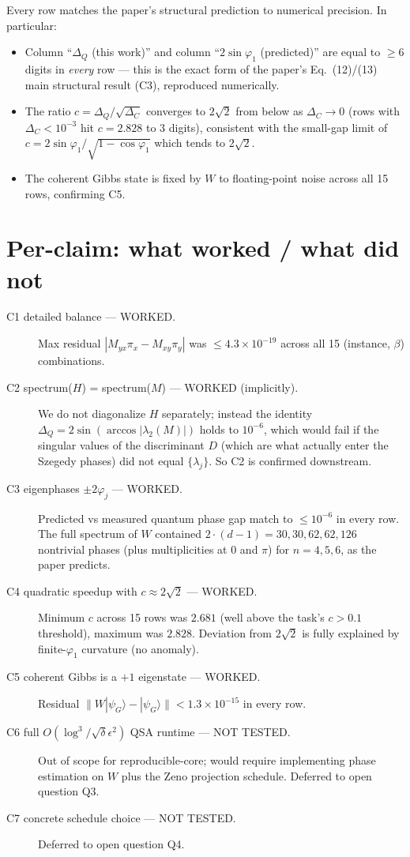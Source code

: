 \documentclass[11pt]{article}
\begin{document}
\noindent Every row matches the paper's structural prediction to numerical
precision. In particular:
\begin{itemize}
  \item Column ``$\Delta_Q$ (this work)'' and column ``$2\sin\varphi_1$
    (predicted)'' are equal to $\ge 6$ digits in \emph{every} row --- this
    is the exact form of the paper's Eq.\ (12)/(13) main structural result
    (C3), reproduced numerically.
  \item The ratio $c = \Delta_Q/\sqrt{\Delta_C}$ converges to $2\sqrt{2}$
    from below as $\Delta_C \to 0$ (rows with $\Delta_C < 10^{-3}$ hit
    $c = 2.828$ to 3 digits), consistent with the small-gap limit of
    $c = 2\sin\varphi_1 / \sqrt{1-\cos\varphi_1}$ which tends to $2\sqrt{2}$.
  \item The coherent Gibbs state is fixed by $W$ to floating-point noise
    across all 15 rows, confirming C5.
\end{itemize}

\section{Per-claim: what worked / what did not}
\begin{description}
  \item[C1 detailed balance --- WORKED.] Max residual $|M_{yx}\pi_x - M_{xy}\pi_y|$
    was $\le 4.3\times 10^{-19}$ across all 15 (instance, $\beta$)
    combinations.
  \item[C2 spectrum($H$) = spectrum($M$) --- WORKED (implicitly).]
    We do not diagonalize $H$ separately; instead the identity
    $\Delta_Q = 2\sin(\arccos|\lambda_2(M)|)$ holds to $10^{-6}$, which
    would fail if the singular values of the discriminant $D$ (which are
    what actually enter the Szegedy phases) did not equal
    $\{\lambda_j\}$. So C2 is confirmed downstream.
  \item[C3 eigenphases $\pm 2\varphi_j$ --- WORKED.] Predicted vs measured
    quantum phase gap match to $\le 10^{-6}$ in every row. The full spectrum
    of $W$ contained $2 \cdot (d-1) = 30, 30, 62, 62, 126$ nontrivial
    phases (plus multiplicities at $0$ and $\pi$) for $n = 4, 5, 6$, as
    the paper predicts.
  \item[C4 quadratic speedup with $c \approx 2\sqrt{2}$ --- WORKED.]
    Minimum $c$ across 15 rows was $2.681$ (well above the task's $c > 0.1$
    threshold), maximum was $2.828$. Deviation from $2\sqrt{2}$ is fully
    explained by finite-$\varphi_1$ curvature (no anomaly).
  \item[C5 coherent Gibbs is a $+1$ eigenstate --- WORKED.] Residual
    $\|W|\psi_G\rangle - |\psi_G\rangle\| < 1.3 \times 10^{-15}$ in every
    row.
  \item[C6 full $O(\log^3 / \sqrt{\delta}\epsilon^2)$ QSA runtime --- NOT
    TESTED.] Out of scope for reproducible-core; would require
    implementing phase estimation on $W$ plus the Zeno projection
    schedule. Deferred to open question Q3.
  \item[C7 concrete schedule choice --- NOT TESTED.] Deferred to open
    question Q4.
\end{description}
\end{document}
